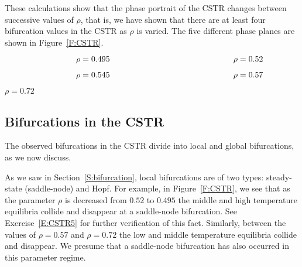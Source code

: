 \documentclass{ximera}
\begin{document}
These calculations show that the phase portrait of the CSTR changes 
between successive values of $\rho$, that is, we have shown that 
there are at least four bifurcation values in the CSTR as $\rho$ 
is varied.  The five different phase planes are shown in Figure~\ref{F:CSTR}.


\begin{figure*}
           \centerline{%
	   }	
		\vspace*{-0.2in}	
		$\hspace{1.2in} \mbox{$\rho=0.495$ \hspace{2.0in} $\rho=0.52$}$
           \centerline{%
	   }
		\vspace*{-0.4in}
		
		$\hspace{1.2in} \mbox{$\rho=0.545$ \hspace{2.0in} $\rho=0.57$}$
		\vspace{0.4in}
	   \centerline{%
           }
 		\vspace*{-0.8in}
		
		\hspace{2.6in} $\rho=0.72$
          \caption{Phase portraits of CSTR \protect\eqref{e:CSTR} 
	with $\gamma=4$, $\eta=-0.75$, $Z=0.5$, $h =3$.}
           \label{F:CSTR}
\end{figure*}


\subsection*{Bifurcations in the CSTR}


The observed bifurcations in the CSTR divide into local and global 
bifurcations, as we now discuss.

As we saw in Section~\ref{S:bifurcation}, local bifurcations are of two 
types: steady-state (saddle-node) and Hopf.  
  For example, in Figure~\ref{F:CSTR}, we see that as 
the parameter $\rho$ is decreased from $0.52$ to $0.495$ the middle and high 
temperature equilibria collide and disappear at a saddle-node bifurcation.  
See Exercise~\ref{E:CSTR5} for further verification of this fact.  Similarly,
between the values of $\rho=0.57$ and $\rho=0.72$ the low and middle 
temperature equilibria collide and disappear.  We presume that a  
saddle-node bifurcation has also occurred in this parameter regime.
\end{document}
